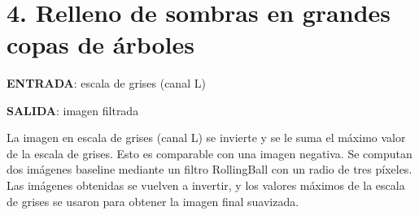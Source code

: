     \begin{center}
    \end{center}
    { \hspace*{\fill} \\}
    
    \begin{center}
    \end{center}
    { \hspace*{\fill} \\}
    
    \begin{center}
    \end{center}
    { \hspace*{\fill} \\}
    
    \hypertarget{relleno-de-sombras-en-grandes-copas-de-uxe1rboles}{%
\section{4. Relleno de sombras en grandes copas de
árboles}\label{relleno-de-sombras-en-grandes-copas-de-uxe1rboles}}

\textbf{ENTRADA}: escala de grises (canal L)

\textbf{SALIDA}: imagen filtrada

La imagen en escala de grises (canal L) se invierte y se le suma el
máximo valor de la escala de grises. Esto es comparable con una imagen
negativa. Se computan dos imágenes baseline mediante un filtro
RollingBall con un radio de tres píxeles. Las imágenes obtenidas se
vuelven a invertir, y los valores máximos de la escala de grises se
usaron para obtener la imagen final suavizada.

